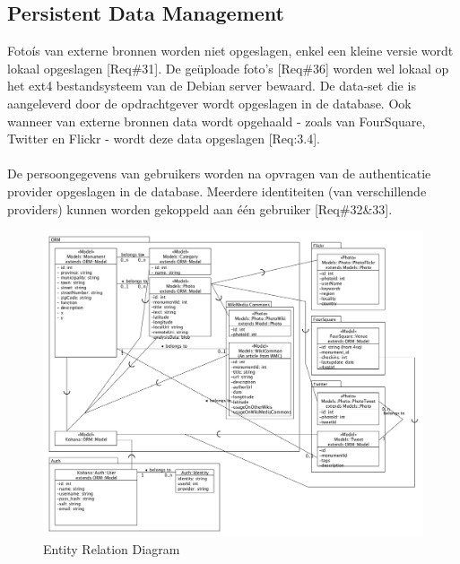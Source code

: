 \documentclass[a4paper,10pt]{article}
\begin{document}
	\subsection{Persistent Data Management}
	Fotoís van externe bronnen worden niet opgeslagen, enkel een kleine versie wordt lokaal opgeslagen [Req\#31]. De ge\"uploade foto's [Req\#36] worden wel lokaal op het ext4 bestandsysteem van de Debian server bewaard. De data-set die is aangeleverd door de opdrachtgever wordt opgeslagen in de database. Ook wanneer van externe bronnen data wordt opgehaald - zoals van FourSquare, Twitter en Flickr - wordt deze data opgeslagen [Req:3.4].\\ \\
De persoongegevens van gebruikers worden na opvragen van de authenticatie provider opgeslagen in de database. Meerdere identiteiten (van verschillende providers) kunnen worden gekoppeld aan \'e\'en gebruiker [Req\#32\&33].
	\begin{figure}[ht!]
	\centering
	\includegraphics[width=15cm]{entityRelationshipDiagram.png}
	\caption{Entity Relation Diagram \label{entityrelationshipdiagram}}
	\end{figure}
\end{document}
